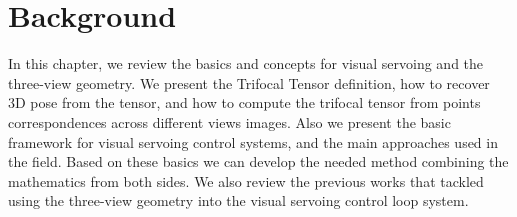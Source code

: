 \chapter{Background} \label{chap:background}

In this chapter, we review the basics and concepts for visual servoing and the three-view geometry. We present the Trifocal Tensor definition, how to recover 3D pose from the tensor, and how to compute the trifocal tensor from points correspondences across different views images. Also we present the basic framework for visual servoing control systems, and the main approaches used in the field. Based on these basics we can develop the needed method combining the mathematics from both sides. We also review the previous works that tackled using the three-view geometry into the visual servoing control loop system.




\newpage

